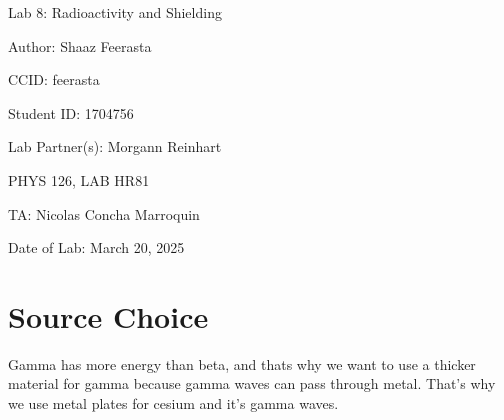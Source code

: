 \documentclass[12pt]{article}
\begin{document}
\pagebreak
\begin{titlepage}
    \begin{center}
        \vspace*{\fill}
        Lab 8: Radioactivity and Shielding

        Author: Shaaz Feerasta

        CCID: feerasta

        Student ID: 1704756

        Lab Partner(s): Morgann Reinhart

        PHYS 126, LAB HR81

        TA: Nicolas Concha Marroquin

        Date of Lab: March 20, 2025
        \vspace*{\fill}
    \end{center}
\end{titlepage}

\section{Source Choice}
Gamma has more energy than beta, and thats why we want to use a thicker material for gamma because gamma waves can pass through metal.
That's why we use metal plates for cesium and it's gamma waves.
\end{document}
